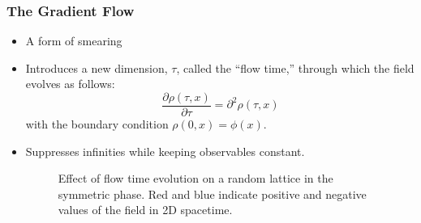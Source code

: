 \documentclass{beamer}
\begin{document}
\begin{frame}
\frametitle{The Gradient Flow}
\begin{itemize}
    \item A form of smearing
    \item Introduces a new dimension, $\tau$, called the ``flow time,'' through which the field evolves as follows:
    \begin{equation}
        \frac{\partial \rho(\tau, x)}{\partial \tau} = \partial^2 \rho(\tau,x)
    \end{equation}
    with the boundary condition $\rho(0, x)=\phi(x)$.

    \item Suppresses infinities while keeping observables constant.

        \begin{figure}[h]
  \centering
          \caption{Effect of flow time evolution on a random lattice in the symmetric phase. Red and blue indicate positive and negative values of the field in 2D spacetime.}
  \label{fig:flow}
\end{figure}

\end{itemize}
\end{frame}
\end{document}
